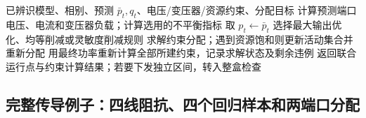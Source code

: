 \documentclass[UTF8,11pt,fontset=fandol,openany,oneside]{ctexbook}
\theoremstyle{definition}
\theoremstyle{remark}
\numberwithin{equation}{chapter}
\begin{document}
\begin{algorithm}[tbp]
\caption{S10 的逐时段运行链：原算法主线，停止与复检显式化}
\label{alg:oe_s10_allocate}
\begin{algorithmic}[1]
\Require 已辨识模型、相别、预测 $\bar p_t,q_t$、电压/变压器/资源约束、分配目标
 \State 计算预测端口电压、电流和变压器负载；计算选用的不平衡指标
   \State 取 $p_t\gets\bar p_t$
 \Else
   \State 选择最大输出优化、均等削减或灵敏度削减规则
   \State 求解约束分配；遇到资源饱和则更新活动集合并重新分配
   \State 用最终功率重新计算全部所建约束，记录求解状态及剩余违例
 \EndIf
 \State 返回联合运行点与约束计算结果；若要下发独立区间，转入整盒检查
\EndFor
\end{algorithmic}
\end{algorithm}

\subsection{完整传导例子：四线阻抗、四个回归样本和两端口分配}
\end{document}
